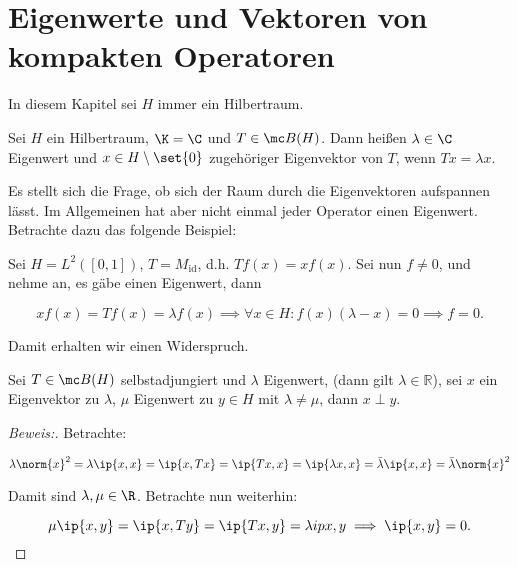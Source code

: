 \section{Eigenwerte und Vektoren von kompakten Operatoren}

In diesem Kapitel sei $H$ immer ein Hilbertraum.


\begin{definition}
	
	Sei $H$ ein Hilbertraum, $\K = \C$ und $T \in \mc B(H)$. Dann heißen $\lambda \in \C$ Eigenwert und $x \in H \setminus \set{0}$ zugehöriger Eigenvektor von $T$, wenn $Tx = \lambda x$.
	
\end{definition}


\begin{rem}
	
	Es stellt sich die Frage, ob sich der Raum durch die Eigenvektoren aufspannen lässt. Im Allgemeinen hat aber nicht einmal jeder Operator einen Eigenwert. Betrachte dazu das folgende Beispiel:
	
\end{rem}


\begin{ex}
	
	Sei $H = L^2([0, 1])$, $T = M_{\text{id}}$, d.h. $Tf(x) = xf(x)$. Sei nun $f \not= 0$, und nehme an, es gäbe einen Eigenwert, dann
	
	\[ xf(x) = Tf(x) = \lambda f(x) \implies \forall x \in H: f(x)(\lambda - x) = 0 \implies f = 0. \]
	
	Damit erhalten wir einen Widerspruch.
	
\end{ex}


\begin{theorem}
	\label{real_ev}
	Sei $T \in \mc B(H)$ selbstadjungiert und $\lambda$ Eigenwert, (dann gilt $\lambda \in \mathbb{R}$), sei $x$ ein Eigenvektor zu $\lambda$, $\mu$ Eigenwert zu $y \in H$ mit $\lambda \not= \mu$, dann $x \perp y$.
	
	\begin{proof}[Beweis:]
		
		Betrachte:
		
		\[ \lambda \norm{x}^2 =\lambda \ip{x, x} = \ip{x, Tx} = \ip{Tx, x} = \ip{\lambda x, x} = \bar\lambda \ip{x, x} = \bar\lambda \norm{x}^2 \]
		
		
		Damit sind $\lambda, \mu \in \R$. Betrachte nun weiterhin:
		
		\[ \mu \ip{x, y} = \ip{x, Ty} = \ip{Tx, y} = \lambda ip{x, y} \implies \ip{x, y} = 0. \]
		
	\end{proof}
	
\end{theorem}


